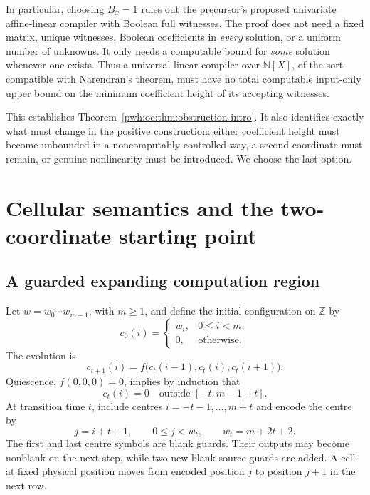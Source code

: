 \documentclass[11pt,letterpaper]{article}
\numberwithin{equation}{section}
\theoremstyle{definition}
\newcommand{\N}{\mathbb N}
\newcommand{\Z}{\mathbb Z}
\begin{document}
In particular, choosing $B_x=1$ rules out the precursor's proposed
univariate affine-linear compiler with Boolean full witnesses. The proof
does not need a fixed matrix, unique witnesses, Boolean coefficients in
\emph{every} solution, or a uniform number of unknowns. It only needs a
computable bound for \emph{some} solution whenever one exists. Thus a
universal linear compiler over $\N[X]$, of the sort compatible with
Narendran's theorem, must have no total computable input-only upper bound
on the minimum coefficient height of its accepting witnesses.

This establishes Theorem~\ref{pwh:oc:thm:obstruction-intro}. It also identifies
exactly what must change in the positive construction: either coefficient
height must become unbounded in a noncomputably controlled way, a second
coordinate must remain, or genuine nonlinearity must be introduced.
We choose the last option.

\section{Cellular semantics and the two-coordinate starting point}
\label{pwh:oc:sec:semantics}

\subsection{A guarded expanding computation region}

Let $w=w_0\cdots w_{m-1}$, with $m\ge1$, and define the initial
configuration on $\Z$ by
\[
 c_0(i)=\begin{cases}w_i,&0\le i<m,\\0,&\text{otherwise}.
 \end{cases}
\]
The evolution is
\begin{equation}
 c_{t+1}(i)=f\bigl(c_t(i-1),c_t(i),c_t(i+1)\bigr).
 \label{pwh:oc:eq:ca}
\end{equation}
Quiescence, $f(0,0,0)=0$, implies by induction that
\begin{equation}
 c_t(i)=0\quad\text{outside }[-t,m-1+t].
 \label{pwh:oc:eq:lightcone}
\end{equation}
At transition time $t$, include centres
$i=-t-1,\ldots,m+t$ and encode the centre by
\[
 j=i+t+1,\qquad 0\le j<w_t,\qquad w_t=m+2t+2.
\]
The first and last centre symbols are blank guards. Their outputs may
become nonblank on the next step, while two new blank source guards are
added. A cell at fixed physical position moves from encoded position $j$
to position $j+1$ in the next row.
\end{document}
